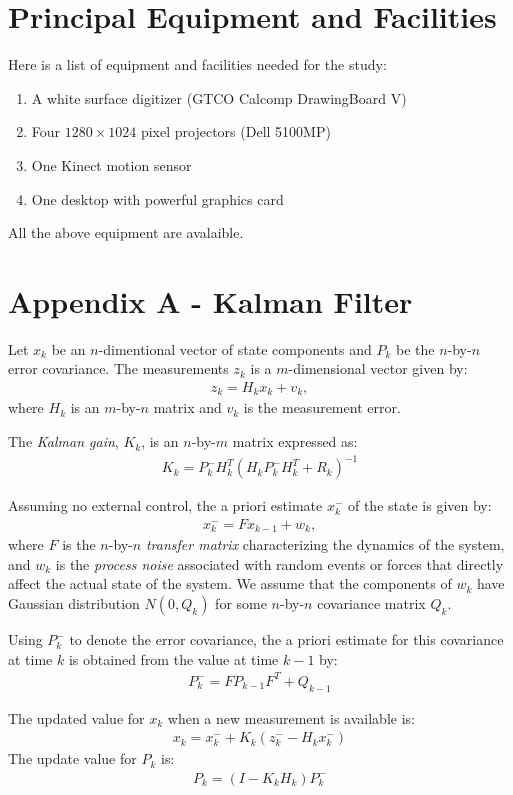 \section{Principal Equipment and Facilities}
Here is a list of equipment and facilities needed for the study:

\begin{enumerate}
  \item A white surface digitizer (GTCO Calcomp DrawingBoard V)
  \item Four $1280\times1024$ pixel projectors (Dell 5100MP)
  \item One Kinect motion sensor
  \item One desktop with powerful graphics card
\end{enumerate}

All the above equipment are avalaible.

\section{Appendix A - Kalman Filter}
Let $x_k$ be an $n$-dimentional vector of state components and $P_k$ be the
$n$-by-$n$ error covariance. The measurements $z_k$ is a $m$-dimensional
vector given by:
\begin{align*}
z_k = H_kx_k + v_k,
\end{align*}
where $H_k$ is an $m$-by-$n$ matrix and $v_k$ is the measurement error.

The \textit{Kalman gain}, $K_k$, is an $n$-by-$m$ matrix expressed as:
\begin{align*}
K_k = P_k^-H_k^T(H_kP_k^-H_k^T + R_k)^{-1}
\end{align*}

Assuming no external control, the a priori estimate $x_k^-$ of the state is
given by:
\begin{align*}
x_k^- = Fx_{k - 1} + w_k,
\end{align*}
where $F$ is the $n$-by-$n$ \textit{transfer matrix} characterizing the
dynamics of the system, and $w_k$ is the \textit{process noise} associated with
random events or forces that directly affect the actual state of the system. We assume that the components of $w_k$
have Gaussian distribution $N(0, Q_k)$ for some $n$-by-$n$ covariance matrix
$Q_k$.

Using $P_k^-$ to denote the error covariance, the a priori estimate for this
covariance at time $k$ is obtained from the value at time $k - 1$ by:
\begin{align*}
P_k^- = FP_{k - 1}F^T + Q_{k - 1}
\end{align*}

The updated value for $x_k$ when a new measurement is available is:
\begin{align*}
x_k = x_k^- + K_k(z_k^- - H_kx_k^-)
\end{align*}
The update value for $P_k$ is:
\begin{align*}
P_k = (I - K_kH_k)P_k^-
\end{align*}
